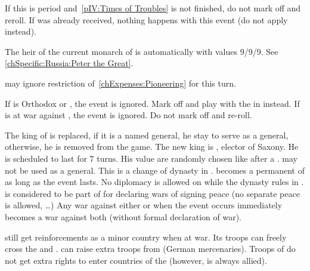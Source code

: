

\condition{}
\aparag If this is period  and~\ref{pIV:Times of Troubles} is not
finished, do not mark off and reroll.
\aparag If  was already received, nothing happens
  with this event (do not apply \RD instead).

\phevnt
\aparag The heir of the current monarch of \RUS is automatically
 with values 9/9/9. See \ref{chSpecific:Russia:Peter
  the Great}.

\phadm
\aparag \RUS may ignore restriction of~\ref{chExpenses:Pioneering} for this
turn.





\condition{}
\aparag If \POL is Orthodox or \CATHCR, the event is ignored. Mark off and
play \RD with the \REVOLT in \POL instead.
\aparag If \POL is at war against \paysSaxe, the event is ignored. Do not mark
off and re-roll.

\phevnt
\aparag The king of \POL is replaced, if it is a named general, he stay to
serve \POL as a general, otherwise, he is removed from the game. The new king
is , elector of Saxony.
\bparag He is scheduled to last for 7 turns.
\bparag His value are randomly chosen like after a .
\bparag {} may not be used as a general.
\bparag This is a change of dynasty in \POL.
\aparag \paysSaxe becomes a permanent \VASSAL of \POL as long as the event
lasts.
\bparag No diplomacy is allowed on \paysSaxe while the dynasty rules in \POL.
\bparag \paysSaxe is considered to be part of \POL for declaring wars of
signing peace (no separate peace is allowed, \ldots)
\aparag Any war against either \paysSaxe or \POL when the event occurs
immediately becomes a war against both (without formal declaration of war).

\phadm
\aparag \paysSaxe still get reinforcements as a minor country when at war. Its
troops can freely cross the \HRE and \POL. \POL can raise extra troops from
\paysSaxe (German mercenaries).
\aparag Troops of \POL do not get extra rights to enter countries of the \HRE
(however, \paysSaxe is always allied).
%


